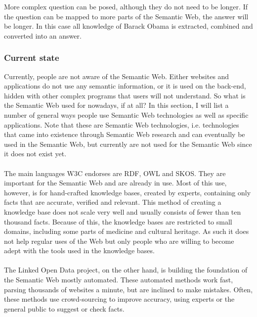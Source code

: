 \documentclass{article}
\begin{document}
 More complex question can be posed, although they do not need to be longer. If the question can be mapped to more parts of the Semantic Web, the answer will be longer. In this case all knowledge of Barack Obama is extracted, combined and converted into an answer.
 
 \subsubsection{Current state}
 Currently, people are not aware of the Semantic Web. Either websites and applications do not use any semantic information, or it is used on the back-end, hidden with other complex programs that users will not understand. So what is the Semantic Web used for nowadays, if at all? In this section, I will list a number of general ways people use Semantic Web technologies as well as specific applications. Note that these are Semantic Web technologies, i.e. technologies that came into existence through Semantic Web research and can eventually be used in the Semantic Web, but currently are not used for the Semantic Web since it does not exist yet.
 \paragraph{}
 The main languages W3C endorses are RDF, OWL and SKOS\cite{rdf, owl, skos}. They are important for the Semantic Web and are already in use. Most of this use, however, is for hand-crafted knowledge bases, created by experts, containing only facts that are accurate, verified and relevant\cite{mika2015schema}. This method of creating a knowledge base does not scale very well and usually consists of fewer than ten thousand facts. Because of this, the knowledge bases are restricted to small domains, including some parts of medicine and cultural heritage\cite{byrne, le2002}. As such it does not help regular uses of the Web but only people who are willing to become adept with the tools used in the knowledge bases.
 \paragraph{} 
 The Linked Open Data project, on the other hand, is building the foundation of the Semantic Web mostly automated. These automated methods work fast, parsing thousands of websites a minute, but are inclined to make mistakes. Often, these methods use crowd-sourcing to improve accuracy, using experts or the general public to suggest or check facts\cite{zhou2007}.
 
\end{document}
